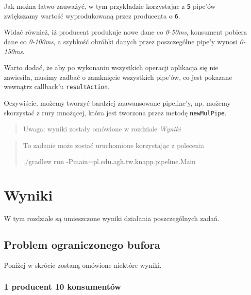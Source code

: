\documentclass[11pt]{article}
\newenvironment{Shaded}{}{}
\newcommand{\NormalTok}[1]{{#1}}
\newcommand{\OperatorTok}[1]{\textcolor[rgb]{0.40,0.40,0.40}{{#1}}}
\newcommand{\ExtensionTok}[1]{{#1}}
\newcommand{\AttributeTok}[1]{\textcolor[rgb]{0.49,0.56,0.16}{{#1}}}
\begin{document}
Jak można łatwo zauważyć, w tym przykładzie korzystając z \texttt{5}
pipe'ów zwiększamy wartość wyprodukowaną przez producenta o \texttt{6}.

Widać również, iż producent produkuje nowe dane co \emph{0-50ms},
konsument pobiera dane co \emph{0-100ms}, a szybkość obróbki danych
przez poszczególne pipe'y wynosi \emph{0-150ms}.

Warto dodać, że aby po wykonaniu wszystkich operacji aplikacja się nie
zawiesiła, musimy zadbać o zamknięcie wszystkich pipe'ów, co jest
pokazane wewnątrz callback'u \texttt{resultAction}.

Oczywiście, możemy tworzyć bardziej zaawansowane pipeline'y, np. możemy
skorzystać z rury mnożącej, która jest tworzona przez metodę
\texttt{newMulPipe}.

\begin{quote}
Uwaga: wyniki zostały omówione w rozdziale \emph{Wyniki}
\end{quote}

\begin{quote}
To zadanie może zostać uruchomione korzystając z polecenia

\begin{Shaded}
\begin{Highlighting}[]
\ExtensionTok{./gradlew}\NormalTok{ run }\AttributeTok{{-}Pmain}\OperatorTok{=}\NormalTok{pl.edu.agh.tw.knapp.pipeline.Main}
\end{Highlighting}
\end{Shaded}
\end{quote}

    \hypertarget{wyniki}{%
\section{Wyniki}\label{wyniki}}

W tym rozdziale są umieszczone wyniki działania poszczególnych zadań.

    \hypertarget{problem-ograniczonego-bufora}{%
\subsection{Problem ograniczonego
bufora}\label{problem-ograniczonego-bufora}}

Poniżej w skrócie zostaną omówione niektóre wyniki.

\hypertarget{producent-10-konsumentuxf3w}{%
\subsubsection{1 producent 10
konsumentów}\label{producent-10-konsumentuxf3w}}
\end{document}

